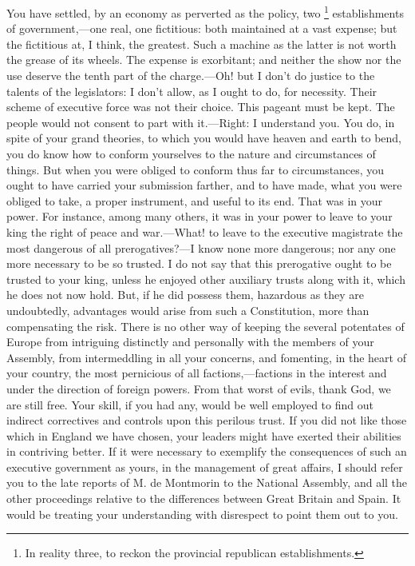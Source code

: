 You have settled, by an economy as perverted as the policy, two
\footnote{ In reality three, to reckon the provincial republican establishments.}
 establishments of government,—one real, one fictitious: both maintained at a vast expense; but the fictitious at, I think, the greatest. Such a machine as the latter is not worth the grease of its wheels. The expense is exorbitant; and neither the show nor the use deserve the tenth part of the charge.—Oh! but I don't do justice to the talents of the legislators: I don't allow, as I ought to do, for necessity. Their scheme of executive force was not their choice. This pageant must be kept. The people would not consent to part with it.—Right: I understand you. You do, in spite of your grand theories, to which you would have heaven and earth to bend, you do know how to conform yourselves to the nature and circumstances of things. But when you were obliged to conform thus far to circumstances, you ought to have carried your submission farther, and to have made, what you were obliged to take, a proper instrument, and useful to its end. That was in your power. For instance, among many others, it was in your power to leave to your king the right of peace and war.—What! to leave to the executive magistrate the most dangerous of all prerogatives?—I know none more dangerous; nor any one more necessary to be so trusted. I do not say that this prerogative ought to be trusted to your king, unless he enjoyed other auxiliary trusts along with it, which he does not now hold. But, if he did possess them, hazardous as they are undoubtedly, advantages would arise from such a Constitution, more than compensating the risk. There is no other way of keeping the several potentates of Europe from intriguing distinctly and personally with the members of your Assembly, from intermeddling in all your concerns, and fomenting, in the heart of your country, the most pernicious of all factions,—factions in the interest and under the direction of foreign powers. From that worst of evils, thank God, we are still free. Your skill, if you had any, would be well employed to find out indirect correctives and controls upon this perilous trust. If you did not like those which in England we have chosen, your leaders might have exerted their abilities in contriving better. If it were necessary to exemplify the consequences of such an executive government as yours, in the management of great affairs, I should refer you to the late reports of M. de Montmorin to the National Assembly, and all the other proceedings relative to the differences between Great Britain and Spain. It would be treating your understanding with disrespect to point them out to you.

